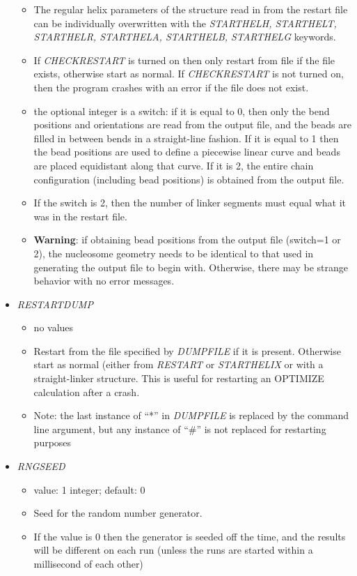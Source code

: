 \documentclass[12pt,dvips]{article}
\begin{document}
\begin{itemize}
\begin{itemize}
    \item The regular helix parameters of the structure read in from the restart file can be individually overwritten with the {\em STARTHELH, STARTHELT, STARTHELR, STARTHELA, STARTHELB, STARTHELG} keywords.
    \item If {\em CHECKRESTART} is turned on then only restart from file if the file exists, otherwise start as normal. If {\em CHECKRESTART} is not turned on, then the program crashes with an error if the file does not exist.
     \item the optional integer is a switch: if it is equal to 0, then only the bend positions and orientations are read from the output file, and the beads are filled in between bends in a straight-line fashion. If it is equal to 1 then the bead positions are used to define a piecewise linear curve and beads are placed equidistant along that curve. If it is 2, the entire chain configuration (including bead positions) is obtained from the output file.
     \item If the switch is 2, then the number of linker segments must equal what it was in the restart file.
    \item {\bf Warning}: if obtaining bead positions from the output file (switch=1 or 2), the nucleosome geometry needs to be identical to that used in generating the output file to begin with. Otherwise, there may be strange behavior with no error messages.
  \end{itemize}
%
\item {\it RESTARTDUMP}
  \begin{itemize}
    \item no values
    \item Restart from the file specified by {\em DUMPFILE} if it is present. Otherwise start as normal (either from {\em RESTART} or {\em STARTHELIX} or with a straight-linker structure. This is useful for restarting an OPTIMIZE calculation after a crash.
    \item Note: the last instance of ``*'' in {\em DUMPFILE} is replaced by the command line argument, but any instance of ``\#'' is not replaced for restarting purposes
  \end{itemize}
%
\item {\it RNGSEED}
  \begin{itemize}
    \item value: 1 integer; default: 0
    \item Seed for the random number generator. 
    \item If the value is 0 then the generator is seeded off the time, and the results will be different on each run (unless the runs are started within a millisecond of each other)

\end{itemize}
\end{itemize}
\end{document}
